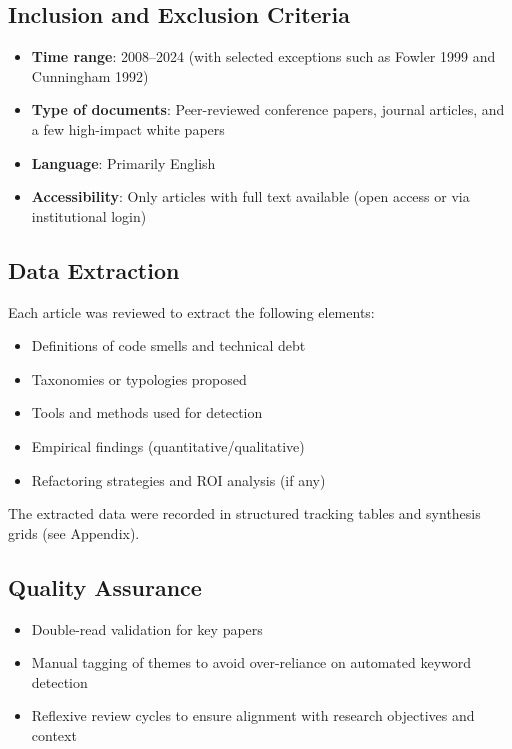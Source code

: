 \subsection{Inclusion and Exclusion Criteria}

\begin{itemize}
    \item \textbf{Time range}: 2008--2024 (with selected exceptions such as Fowler 1999 and Cunningham 1992)
    \item \textbf{Type of documents}: Peer-reviewed conference papers, journal articles, and a few high-impact white papers
    \item \textbf{Language}: Primarily English
    \item \textbf{Accessibility}: Only articles with full text available (open access or via institutional login)
\end{itemize}

\subsection{Data Extraction}

Each article was reviewed to extract the following elements:
\begin{itemize}
    \item Definitions of code smells and technical debt
    \item Taxonomies or typologies proposed
    \item Tools and methods used for detection
    \item Empirical findings (quantitative/qualitative)
    \item Refactoring strategies and ROI analysis (if any)
\end{itemize}

The extracted data were recorded in structured tracking tables and synthesis grids (see Appendix).

\subsection{Quality Assurance}

\begin{itemize}
    \item Double-read validation for key papers
    \item Manual tagging of themes to avoid over-reliance on automated keyword detection
    \item Reflexive review cycles to ensure alignment with research objectives and context
\end{itemize}

